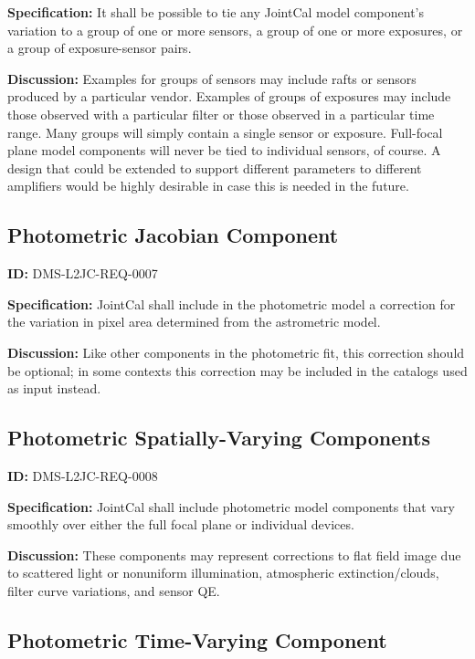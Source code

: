 \documentclass[SE,toc,lsstdraft]{lsstdoc}
\begin{document}
\textbf{Specification:}
It shall be possible to tie any JointCal model component's variation to a group of one or more sensors, a group of one or more exposures, or a group of exposure-sensor pairs.

\textbf{Discussion:}
Examples for groups of sensors may include rafts or sensors produced by a particular vendor.  Examples of groups of exposures may include those observed with a particular filter or those observed in a particular time range.  Many groups will simply contain a single sensor or exposure.  Full-focal plane model components will never be tied to individual sensors, of course.  A design that could be extended to support different parameters to different amplifiers would be highly desirable in case this is needed in the future.

\subsection{Photometric Jacobian Component}

\label{DMS-L2JC-REQ-0007}
\textbf{ID:} DMS-L2JC-REQ-0007

\textbf{Specification:}
JointCal shall include in the photometric model a correction for the variation in pixel area determined from the astrometric model.

\textbf{Discussion:}
Like other components in the photometric fit, this correction should be optional; in some contexts this correction may be included in the catalogs used as input instead.

\subsection{Photometric Spatially-Varying Components}

\label{DMS-L2JC-REQ-0008}
\textbf{ID:} DMS-L2JC-REQ-0008

\textbf{Specification:}
JointCal shall include photometric model components that vary smoothly over either the full focal plane or individual devices.

\textbf{Discussion:}
These components may represent corrections to flat field image due to scattered light or nonuniform illumination, atmospheric extinction/clouds, filter curve variations, and sensor QE.

\subsection{Photometric Time-Varying Component}
\end{document}
